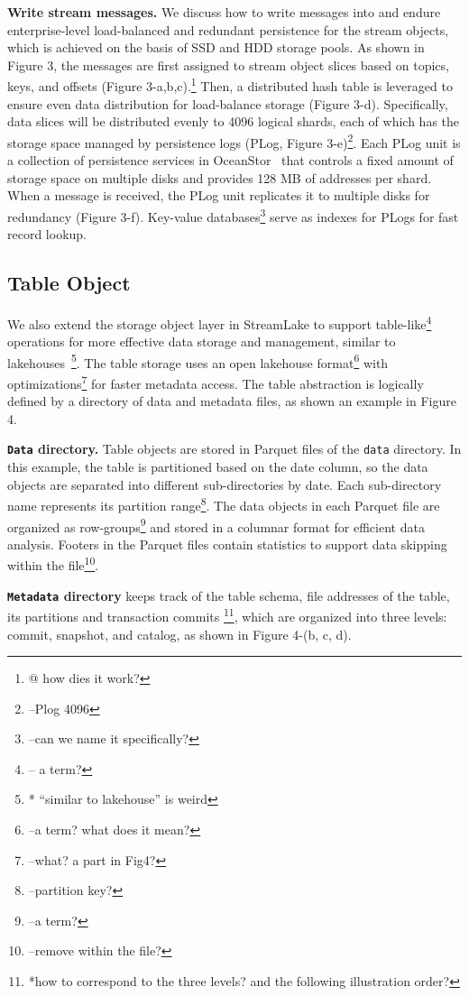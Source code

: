 \noindent \textbf{Write stream messages.} We discuss how to write messages into \sys and endure enterprise-level load-balanced and redundant persistence for the stream objects, which is achieved on the basis of SSD and HDD storage pools.  As shown in Figure 3, the messages are first   assigned to stream object slices based on topics, keys, and offsets (Figure 3-a,b,c).\footnote{@ how dies it work?} Then, a distributed hash table is leveraged to ensure even data distribution for load-balance storage (Figure 3-d). Specifically, data slices will be distributed evenly to 4096 logical shards, each of which has the storage space managed by persistence logs (PLog, Figure 3-e)\footnote{--Plog 4096}. Each PLog unit is a collection of persistence services in OceanStor~\cite{} that controls a fixed amount of storage space on multiple disks and provides 128 MB of addresses per shard. When a message is received, the PLog unit replicates it to multiple disks for redundancy (Figure 3-f). Key-value databases\footnote{--can we name it specifically?} serve as indexes for PLogs for fast record lookup.


\subsection{Table Object}
We also extend the storage object layer in StreamLake to support table-like\footnote{-- a term?} operations for more effective data storage and management, similar to lakehouses~\cite{}\footnote{* ``similar to lakehouse'' is weird}. The table storage uses an open lakehouse format\footnote{--a term? what does it mean?} with optimizations\footnote{--what? a part in Fig4?} for faster metadata access. The table abstraction is logically defined by a directory of data and metadata files, as shown an example  in Figure 4.

\noindent \textbf{\texttt{Data} directory.} Table objects are stored in Parquet files of the \texttt{data} directory. In this example, the table is partitioned based on the date column, so the data objects are separated into different sub-directories by date. Each sub-directory name represents its partition range\footnote{--partition key?}. The data objects in each Parquet file are organized as row-groups\footnote{--a term?} and stored in a columnar format for efficient data analysis. Footers in the Parquet files contain statistics to support data skipping within the file\footnote{--remove within the file?}.

\noindent \textbf{\texttt{Metadata} directory}  keeps track of the table schema, file addresses of the table, its partitions and transaction commits \footnote{*how to correspond to the three levels? and the following illustration order?}, which are organized into three levels: commit, snapshot, and catalog, as shown in Figure 4-(b, c, d).

